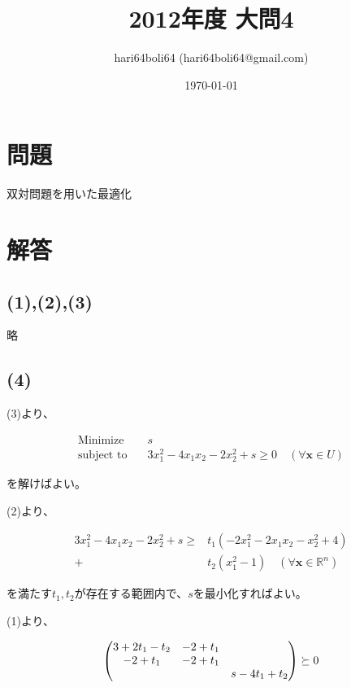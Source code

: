 \documentclass[a4paper, 10pt, dvipdfmx]{jlreq}
\begin{document}
\title{2012年度 大問4}
\author{hari64boli64 (hari64boli64@gmail.com)}
\date{\today}
\maketitle

\section{問題}

双対問題を用いた最適化

\section{解答}

\subsection*{(1),(2),(3)}

略

\subsection*{(4)}

(3)より、

\begin{align*}
  \text{Minimize} \quad   & s                                                           \\
  \text{subject to} \quad & 3x_1^2-4x_1x_2-2x_2^2+s \geq 0 \quad (\forall \bm{x} \in U)
\end{align*}

を解けばよい。

(2)より、

\begin{align*}
  3x_1^2-4x_1x_2-2x_2^2+s \geq {} & t_1(-2x_1^2-2x_1x_2-x_2^2+4)                         \\
  +                               & t_2(x_1^2-1) \quad (\forall \bm{x} \in \mathbb{R}^n)
\end{align*}

を満たす$t_1,t_2$が存在する範囲内で、$s$を最小化すればよい。

(1)より、

\begin{align*}
  \mqty(
  3+2t_1-t_2 & -2+t_1 &            \\
  -2+t_1     & -2+t_1 &            \\
             &        & s-4t_1+t_2
  ) \succeq 0
\end{align*}
\end{document}
